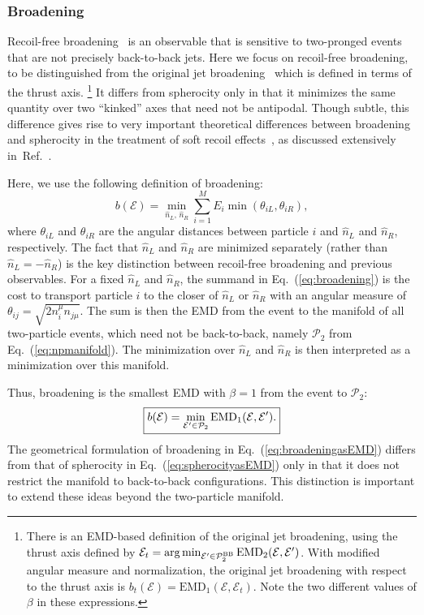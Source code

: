 \documentclass[letterpaper,11pt]{article}
\DeclareMathOperator*{\argmin}{arg\,min}
\DeclareRobustCommand{\Eq}[1]{Eq.~(\ref{#1})}
\DeclareRobustCommand{\Ref}[1]{Ref.~\cite{#1}}
\begin{document}
\subsubsection{Broadening}


Recoil-free broadening~\cite{Larkoski:2014uqa} is an observable that is sensitive to two-pronged events that are not precisely back-to-back jets.
%
Here we focus on recoil-free broadening, to be distinguished from the original jet broadening~\cite{Rakow:1981qn,Ellis:1986ig,Catani:1992jc} which is defined in terms of the thrust axis.%
%
\footnote{There is an EMD-based definition of the original jet broadening, using the thrust axis defined by $\mathcal E_t = \argmin_{\mathcal E' \in \mathcal P^{\rm BB}_2} \text{EMD}_2(\mathcal E, \mathcal E')$.  With modified angular measure and normalization, the original jet broadening with respect to the thrust axis is $b_t(\mathcal E) = \text{EMD}_1(\mathcal E, \mathcal E_t)$.  Note the two different values of $\beta$ in these expressions.}
%
It differs from spherocity only in that it minimizes the same quantity over two ``kinked'' axes that need not be antipodal.
%
Though subtle, this difference gives rise to very important theoretical differences between broadening and spherocity in the treatment of soft recoil effects~\cite{Dokshitzer:1998kz}, as discussed extensively in~\Ref{Larkoski:2014uqa}.


Here, we use the following definition of broadening:
%
\begin{equation}\label{eq:broadening}
b(\mathcal E) = \min_{\hat n_L,\,\hat n_R} \sum_{i=1}^M E_i \min(\theta_{iL}, \theta_{iR}),
\end{equation}
where $\theta_{iL}$ and $\theta_{iR}$ are the angular distances between particle $i$ and $\hat n_L$ and $\hat n_R$, respectively.
%
The fact that $\hat n_L$ and $\hat n_R$ are minimized separately (rather than $\hat n_L = -\hat n_R$) is the key distinction between recoil-free broadening and previous observables.
%
For a fixed $\hat n_L$ and $\hat n_R$, the summand in \Eq{eq:broadening} is the cost to transport particle $i$ to the closer of $\hat n_L$ or $\hat n_R$ with an angular measure of $\theta_{ij} = \sqrt{2n_i^\mu n_{j\mu}}$.
%
The sum is then the EMD from the event to the manifold of all two-particle events, which need not be back-to-back, namely $\mathcal P_2$ from \Eq{eq:npmanifold}.
%
The minimization over $\hat n_L$ and $\hat n_R$ is then interpreted as a minimization over this manifold.


Thus, broadening is the smallest EMD with $\beta=1$ from the event to $\mathcal P_2$:
%
\begin{equation}\label{eq:broadeningasEMD}
\begin{boxed}{
b(\mathcal E) = \min_{\mathcal E' \in \mathcal P_2} \text{EMD}_1(\mathcal E, \mathcal E').
}\end{boxed}
\end{equation}
%
The geometrical formulation of broadening in \Eq{eq:broadeningasEMD} differs from that of spherocity in \Eq{eq:spherocityasEMD} only in that it does not restrict the manifold to back-to-back configurations.%
%
This distinction is important to extend these ideas beyond the two-particle manifold.
\end{document}
